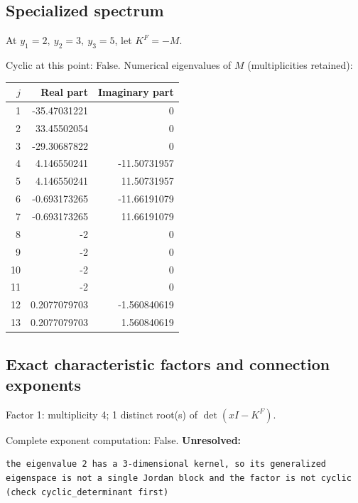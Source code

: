 \documentclass[10pt,a4paper]{article}
\newcommand{\fitmath}[1]{\sbox{\mathbox}{$\displaystyle #1$}\ifdim\wd\mathbox>\linewidth\resizebox{\linewidth}{!}{\usebox{\mathbox}}\else\usebox{\mathbox}\fi}
\begin{document}
\subsection*{Specialized spectrum}
At $y_1=2,\ y_2=3,\ y_3=5$, let $K^F=-M$.
\begin{center}\fitmath{\Delta=0}\end{center}
Cyclic at this point: False.
Numerical eigenvalues of $M$ (multiplicities retained):
\begin{center}\small\begin{tabular}{rrr}\toprule $j$ & Real part & Imaginary part\\\midrule
1 & -35.47031221 & 0\\
2 & 33.45502054 & 0\\
3 & -29.30687822 & 0\\
4 & 4.146550241 & -11.50731957\\
5 & 4.146550241 & 11.50731957\\
6 & -0.693173265 & -11.66191079\\
7 & -0.693173265 & 11.66191079\\
8 & -2 & 0\\
9 & -2 & 0\\
10 & -2 & 0\\
11 & -2 & 0\\
12 & 0.2077079703 & -1.560840619\\
13 & 0.2077079703 & 1.560840619\\
\bottomrule\end{tabular}\end{center}
\subsection*{Exact characteristic factors and connection exponents}
Factor 1: multiplicity 4; 1 distinct root(s) of $\det(xI-K^F)$.
\begin{center}\fitmath{\begin{aligned}p_{1}(x)&=x - 2\end{aligned}}\end{center}
Complete exponent computation: False.
\textbf{Unresolved:}

\begin{lstlisting}
the eigenvalue 2 has a 3-dimensional kernel, so its generalized eigenspace is not a single Jordan block and the factor is not cyclic (check cyclic_determinant first)
\end{lstlisting}
\end{document}
